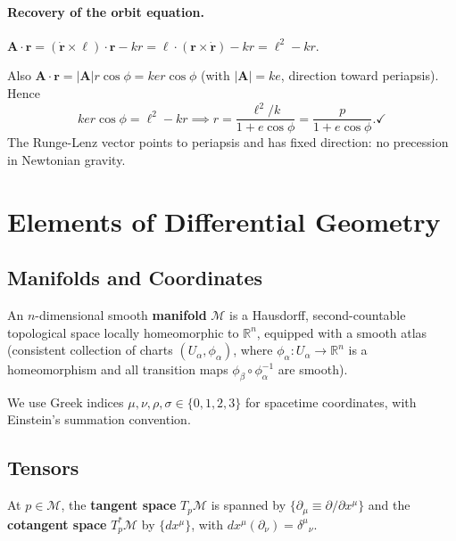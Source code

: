 \documentclass[12pt,a4paper]{article}
\theoremstyle{plain}
\theoremstyle{definition}
\theoremstyle{remark}
\newcommand{\R}{\mathbb{R}}
\newcommand{\ve}[1]{\mathbf{#1}}           %
\newcommand{\lv}{\boldsymbol{\ell}}
\newcommand{\Av}{\ve{A}}
\newcommand{\rv}{\ve{r}}
\begin{document}
\paragraph{Recovery of the orbit equation.}
$\Av\cdot\rv = (\dot{\rv}\times\lv)\cdot\rv - kr = \lv\cdot(\rv\times\dot{\rv})-kr = \ell^2-kr$.

Also $\Av\cdot\rv = |\Av|r\cos\phi = ker\cos\phi$ (with $|\Av|=ke$, direction toward periapsis). Hence
\[
  ker\cos\phi = \ell^2-kr
  \implies
  r = \frac{\ell^2/k}{1+e\cos\phi} = \frac{p}{1+e\cos\phi}. \checkmark
\]
The Runge-Lenz vector points to periapsis and has fixed direction: no precession in Newtonian gravity.

\section{Elements of Differential Geometry}

\subsection{Manifolds and Coordinates}

An $n$-dimensional smooth \textbf{manifold} $\mathcal{M}$ is a Hausdorff, second-countable topological space locally homeomorphic to $\R^n$, equipped with a smooth atlas (consistent collection of charts $(U_\alpha,\phi_\alpha)$, where $\phi_\alpha:U_\alpha\to\R^n$ is a homeomorphism and all transition maps $\phi_\beta\circ\phi_\alpha^{-1}$ are smooth).

We use Greek indices $\mu,\nu,\rho,\sigma\in\{0,1,2,3\}$ for spacetime coordinates, with Einstein's summation convention.

\subsection{Tensors}

At $p\in\mathcal{M}$, the \textbf{tangent space} $T_p\mathcal{M}$ is spanned by $\{\partial_\mu\equiv\partial/\partial x^\mu\}$ and the \textbf{cotangent space} $T_p^*\mathcal{M}$ by $\{dx^\mu\}$, with $dx^\mu(\partial_\nu) = \delta^\mu{}_\nu$.
\end{document}
